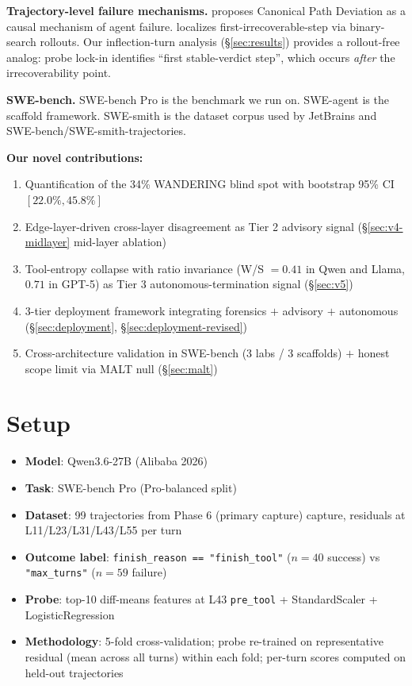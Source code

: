 \documentclass[11pt]{article}
\begin{document}
\textbf{Trajectory-level failure mechanisms.} \cite{canonical_path_2026} proposes Canonical Path Deviation as a causal mechanism of agent failure. \cite{elpo_2026} localizes first-irrecoverable-step via binary-search rollouts. Our inflection-turn analysis (\S\ref{sec:results}) provides a rollout-free analog: probe lock-in identifies ``first stable-verdict step'', which occurs \emph{after} the irrecoverability point.

\textbf{SWE-bench.} SWE-bench Pro \cite{swebench_pro_2025} is the benchmark we run on. SWE-agent \cite{swe_agent_2024} is the scaffold framework. SWE-smith \cite{swe_smith_2025} is the dataset corpus used by JetBrains and SWE-bench/SWE-smith-trajectories.

\textbf{Our novel contributions:}
\begin{enumerate}
\item Quantification of the 34\% WANDERING blind spot with bootstrap 95\% CI $[22.0\%, 45.8\%]$
\item Edge-layer-driven cross-layer disagreement as Tier 2 advisory signal (\S\ref{sec:v4-midlayer} mid-layer ablation)
\item Tool-entropy collapse with ratio invariance (W/S $= 0.41$ in Qwen and Llama, $0.71$ in GPT-5) as Tier 3 autonomous-termination signal (\S\ref{sec:v5})
\item 3-tier deployment framework integrating forensics $+$ advisory $+$ autonomous (\S\ref{sec:deployment}, \S\ref{sec:deployment-revised})
\item Cross-architecture validation in SWE-bench (3 labs / 3 scaffolds) $+$ honest scope limit via MALT null (\S\ref{sec:malt})
\end{enumerate}

\section{Setup}

\begin{itemize}
\item \textbf{Model}: Qwen3.6-27B (Alibaba 2026)
\item \textbf{Task}: SWE-bench Pro (Pro-balanced split)
\item \textbf{Dataset}: 99 trajectories from Phase 6 (primary capture) capture, residuals at L11/L23/L31/L43/L55 per turn
\item \textbf{Outcome label}: \texttt{finish\_reason == "finish\_tool"} ($n=40$ success) vs \texttt{"max\_turns"} ($n=59$ failure)
\item \textbf{Probe}: top-10 diff-means features at L43 \texttt{pre\_tool} + StandardScaler + LogisticRegression
\item \textbf{Methodology}: 5-fold cross-validation; probe re-trained on representative residual (mean across all turns) within each fold; per-turn scores computed on held-out trajectories
\end{itemize}
\end{document}
